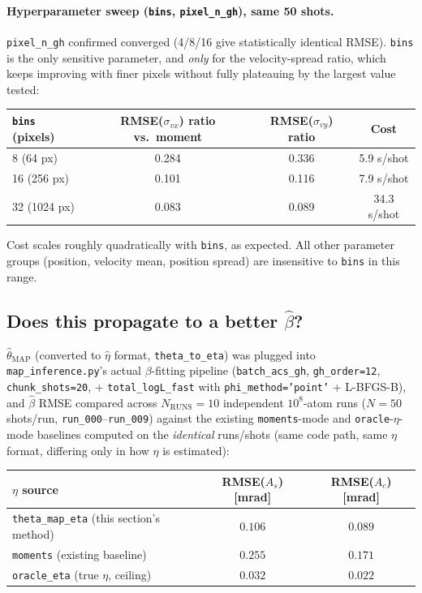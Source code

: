 \documentclass[11pt,a4paper]{article}
\newcommand{\code}[1]{\texttt{#1}}
\begin{document}
\paragraph{Hyperparameter sweep (\code{bins}, \code{pixel\_n\_gh}), same
50 shots.} \code{pixel\_n\_gh} confirmed converged (4/8/16 give
statistically identical RMSE). \code{bins} is the only sensitive parameter,
and \emph{only} for the velocity-spread ratio, which keeps improving with
finer pixels without fully plateauing by the largest value tested:

\begin{center}
\begin{tabular}{lccc}
\toprule
\code{bins} (pixels) & RMSE($\sigma_{vx}$) ratio vs.\ moment & RMSE($\sigma_{vy}$) ratio & Cost \\
\midrule
8 (64 px)    & 0.284 & 0.336 & 5.9 s/shot \\
16 (256 px)  & 0.101 & 0.116 & 7.9 s/shot \\
32 (1024 px) & 0.083 & 0.089 & 34.3 s/shot \\
\bottomrule
\end{tabular}
\end{center}

Cost scales roughly quadratically with \code{bins}, as expected. All other
parameter groups (position, velocity mean, position spread) are
insensitive to \code{bins} in this range.

\subsection{Does this propagate to a better $\hat\beta$?}
\label{sec:2026-07-20-beta}

$\hat\theta_{\mathrm{MAP}}$ (converted to $\hat\eta$ format,
\code{theta\_to\_eta}) was plugged into \code{map\_inference.py}'s actual
$\beta$-fitting pipeline (\code{batch\_acs\_gh}, \code{gh\_order=12},
\code{chunk\_shots=20}, + \code{total\_logL\_fast} with
\code{phi\_method='point'} + L-BFGS-B), and $\hat\beta$ RMSE compared across
$N_{\mathrm{RUNS}}=10$ independent $10^8$-atom runs ($N=50$ shots/run,
\code{run\_000}--\code{run\_009}) against the existing \code{moments}-mode
and \code{oracle}-$\eta$-mode baselines computed on the \emph{identical}
runs/shots (same code path, same $\eta$ format, differing only in how
$\eta$ is estimated):

\begin{center}
\begin{tabular}{lcc}
\toprule
$\eta$ source & RMSE($A_s$) [mrad] & RMSE($A_c$) [mrad] \\
\midrule
\code{theta\_map\_eta} (this section's method) & $\mathbf{0.106}$ & $\mathbf{0.089}$ \\
\code{moments} (existing baseline)             & $0.255$          & $0.171$          \\
\code{oracle\_eta} (true $\eta$, ceiling)       & $0.032$          & $0.022$          \\
\bottomrule
\end{tabular}
\end{center}
\end{document}
